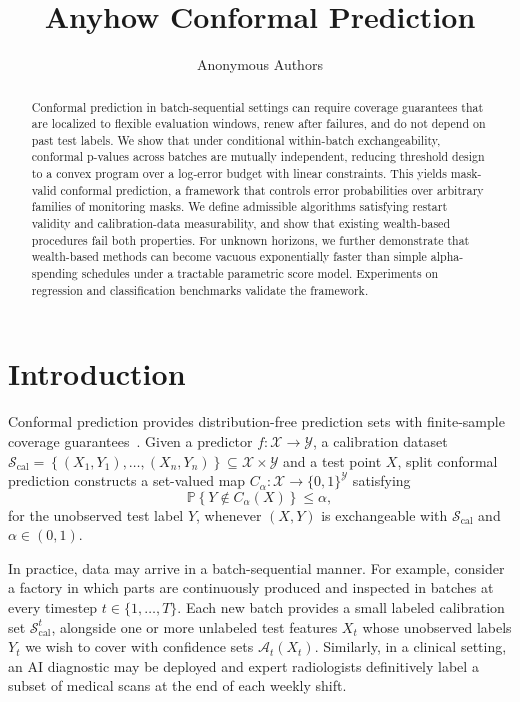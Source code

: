 \documentclass{uai2026} %
\title{Anyhow Conformal Prediction}
\author[1]{Anonymous Authors}
\affil[1]{Anonymous Affiliation}
\newcommand{\1}{\mathbf{1}}
\newcommand{\prob}{\mathbb{P}}
\newcommand{\xcal}{\mathcal{X}}
\newcommand{\ycal}{\mathcal{Y}}
\newcommand{\scal}{\mathcal{S}}
\newcommand{\ens}[1]{\left\{#1\right\}}
\newcommand{\cali}{\mathrm{cal}}
\newcommand{\scalcal}{\scal_{\cali}}
\newcommand{\acal}{\mathcal{A}}
\begin{document}
\maketitle

\begin{abstract}
Conformal prediction in batch-sequential settings can require coverage guarantees that are localized to flexible evaluation windows, renew after failures, and do not depend on past test labels. We show that under conditional within-batch exchangeability, conformal p-values across batches are mutually independent, reducing threshold design to a convex program over a log-error budget with linear constraints. This yields mask-valid conformal prediction, a framework that controls error probabilities over arbitrary families of monitoring masks. We define admissible algorithms satisfying restart validity and calibration-data measurability, and show that existing wealth-based procedures fail both properties. For unknown horizons, we further demonstrate that wealth-based methods can become vacuous exponentially faster than simple alpha-spending schedules under a tractable parametric score model. Experiments on regression and classification benchmarks validate the framework.
\end{abstract}


\section{Introduction}

Conformal prediction provides distribution-free prediction sets with finite-sample coverage guarantees~\citep{vovk2005algorithmic,angelopoulos2024theoretical,shafer2008tutorial}.
Given a predictor $f:\xcal\to\ycal$, a calibration dataset $\scalcal=\ens{(X_1,Y_1),\ldots,(X_n,Y_n)}\subseteq\xcal\times\ycal$ and a test point $X$, split conformal prediction constructs a set-valued map $C_\alpha:\xcal \to \{0,1\}^{\ycal}$ satisfying
\begin{equation*}
  \prob\ens{Y\not\in C_\alpha(X)}\le \alpha,
\end{equation*}
for the unobserved test label $Y$, whenever $(X,Y)$ is exchangeable with $\scalcal$ and $\alpha\in(0,1)$.

In practice, data may arrive in a batch-sequential manner. For example, consider a factory in which parts are continuously produced and inspected in batches at every timestep $t\in\{1,\dots,T\}$. Each new batch provides a small labeled calibration set $\scalcal^t$, alongside one or more unlabeled test features $X_t$ whose unobserved labels $Y_t$ we wish to cover with confidence sets $\acal_t(X_t)$. Similarly, in a clinical setting, an AI diagnostic may be deployed and expert radiologists definitively label a subset of medical scans at the end of each weekly shift.
\end{document}
